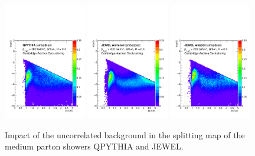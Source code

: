 \begin{figure}
\centering
\includegraphics[width=0.32\textwidth]
{figures/LundMC/FinalPlots/QPythia_Emb.pdf}
\includegraphics[width=0.32\textwidth]
{figures/LundMC/FinalPlots/Jewel_MedEmb_RecoilOff.pdf}
\includegraphics[width=0.32\textwidth]
{figures/LundMC/FinalPlots/Jewel_MedEmb_RecoilOn.pdf}\\
\caption{Impact of the uncorrelated background in the splitting map of the medium parton showers QPYTHIA and JEWEL. 
}
\label{fig:UncorrelatedBkgSignal}
\end{figure}
